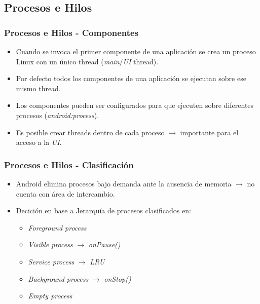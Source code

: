 \subsection{Procesos e Hilos}
\begin{frame}
  \frametitle{Procesos e Hilos - Componentes}
  \begin{itemize}
    \item Cuando se invoca el primer componente de una aplicación se crea un proceso Linux con un único thread (\textit{main}/\textit{UI} thread).
    
    \item Por defecto todos los componentes de una aplicación se ejecutan sobre ese mismo thread.
    
    \item Los componentes pueden ser configurados para que ejecuten sobre diferentes procesos (\textit{android:process}).
    
    \item Es posible crear threads dentro de cada proceso $\rightarrow$ importante para el acceso a la \textit{UI}.
  \end{itemize}
\end{frame}

\begin{frame}
  \frametitle{Procesos e Hilos - Clasificación}
  \begin{itemize}
    \item Android elimina procesos bajo demanda ante la ausencia de memoria $\rightarrow$ no cuenta con área de intercambio.
    
    \item Decición en base a Jerarquía de procesos clasificados en:
    \begin{itemize}
     \item \textit{Foreground process}
     \item \textit{Visible process} $\rightarrow$ \textit{onPause()}
     \item \textit{Service process} $\rightarrow$ \textit{LRU}
     \item \textit{Background process} $\rightarrow$ \textit{onStop()}
     \item \textit{Empty process}
    \end{itemize}       
  \end{itemize}
\end{frame}

